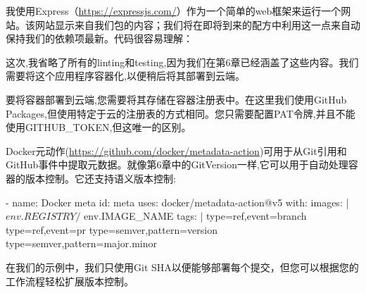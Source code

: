 
我使用Express（\url{https://expressjs.com/}）作为一个简单的web框架来运行一个网站。该网站显示来自我们包的内容；我们将在即将到来的配方中利用这一点来自动保持我们的依赖项最新。代码很容易理解：


这次,我省略了所有的linting和testing,因为我们在第6章已经涵盖了这些内容。我们需要将这个应用程序容器化,以便稍后将其部署到云端。

要将容器部署到云端,您需要将其存储在容器注册表中。在这里我们使用GitHub Packages,但使用特定于云的注册表的方式相同。您只需要配置PAT令牌,并且不能使用GITHUB\_TOKEN,但这唯一的区别。


Docker元动作(\url{https://github.com/docker/metadata-action})可用于从Git引用和GitHub事件中提取元数据。就像第6章中的GitVersion一样,它可以用于自动处理容器的版本控制。它还支持语义版本控制:

\begin{shell}
- name: Docker meta
  id: meta
  uses: docker/metadata-action@v5
  with:
    images: |
      ${{ env.REGISTRY }}/${{ env.IMAGE_NAME }}
    tags: |
      type=ref,event=branch
      type=ref,event=pr
      type=semver,pattern={{version}}
      type=semver,pattern={{major}}.{{minor}}
\end{shell}

在我们的示例中，我们只使用Git SHA以便能够部署每个提交，但您可以根据您的工作流程轻松扩展版本控制。
